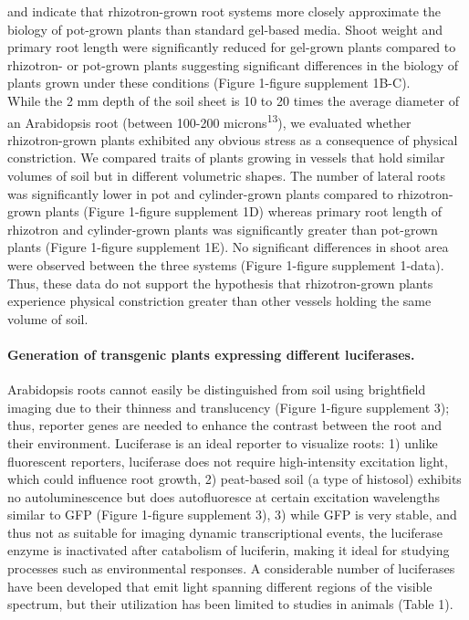\documentclass[]{article}
\begin{document}
and indicate that rhizotron-grown root systems more closely approximate
the biology of pot-grown plants than standard gel-based media. Shoot
weight and primary root length were significantly reduced for gel-grown
plants compared to rhizotron- or pot-grown plants suggesting significant
differences in the biology of plants grown under these conditions
(Figure 1-figure supplement 1B-C).\\While the 2 mm depth of the soil
sheet is 10 to 20 times the average diameter of an Arabidopsis root
(between 100-200 microns\textsuperscript{13}), we evaluated whether
rhizotron-grown plants exhibited any obvious stress as a consequence of
physical constriction. We compared traits of plants growing in vessels
that hold similar volumes of soil but in different volumetric shapes.
The number of lateral roots was significantly lower in pot and
cylinder-grown plants compared to rhizotron-grown plants (Figure
1-figure supplement 1D) whereas primary root length of rhizotron and
cylinder-grown plants was significantly greater than pot-grown plants
(Figure 1-figure supplement 1E). No significant differences in shoot
area were observed between the three systems (Figure 1-figure supplement
1-data). Thus, these data do not support the hypothesis that
rhizotron-grown plants experience physical constriction greater than
other vessels holding the same volume of soil.

\paragraph{Generation of transgenic plants expressing different
luciferases.}\label{generation-of-transgenic-plants-expressing-different-luciferases.}

Arabidopsis roots cannot easily be distinguished from soil using
brightfield imaging due to their thinness and translucency (Figure
1-figure supplement 3); thus, reporter genes are needed to enhance the
contrast between the root and their environment. Luciferase is an ideal
reporter to visualize roots: 1) unlike fluorescent reporters, luciferase
does not require high-intensity excitation light, which could influence
root growth, 2) peat-based soil (a type of histosol) exhibits no
autoluminescence but does autofluoresce at certain excitation
wavelengths similar to GFP (Figure 1-figure supplement 3), 3) while GFP
is very stable, and thus not as suitable for imaging dynamic
transcriptional events, the luciferase enzyme is inactivated after
catabolism of luciferin, making it ideal for studying processes such as
environmental responses. A considerable number of luciferases have been
developed that emit light spanning different regions of the visible
spectrum, but their utilization has been limited to studies in animals
(Table 1).
\end{document}
